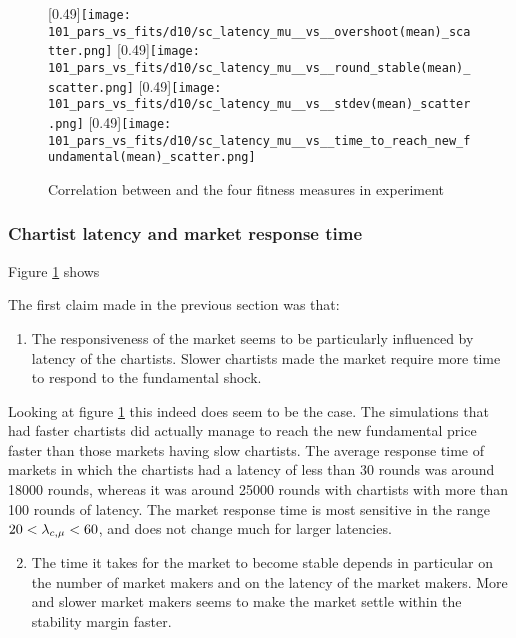 \begin{figure}
	\centering
	[0.49\linewidth]{\texttt{[image: 101\_pars\_vs\_fits/d10/sc\_latency\_mu\_\_vs\_\_overshoot(mean)\_scatter.png]}}
	[0.49\linewidth]{\texttt{[image: 101\_pars\_vs\_fits/d10/sc\_latency\_mu\_\_vs\_\_round\_stable(mean)\_scatter.png]}}
	[0.49\linewidth]{\texttt{[image: 101\_pars\_vs\_fits/d10/sc\_latency\_mu\_\_vs\_\_stdev(mean)\_scatter.png]}}
	[0.49\linewidth]{\texttt{[image: 101\_pars\_vs\_fits/d10/sc\_latency\_mu\_\_vs\_\_time\_to\_reach\_new\_fundamental(mean)\_scatter.png]}}
	\caption{Correlation between \sclatencymu and the four fitness measures in experiment \dten}
	\label{fig:d10_parvfit_sclatencymu}
\end{figure}

\subsubsection{Chartist latency and market response time}
Figure \ref{fig:d10_parvfit_sclatencymu} shows 

The first claim made in the previous section was that:
\begin{enumerate}
\setcounter{enumi}{0}
\item The responsiveness of the market seems to be particularly influenced by latency of the chartists. Slower chartists made the market require more time to respond to the fundamental shock.
\end{enumerate}
Looking at figure \ref{fig:d10_parvfit_sclatencymu} this indeed does seem to be the case. The simulations that had faster chartists did actually manage to reach the new fundamental price faster than those markets having slow chartists. The average response time of markets in which the chartists had a latency of less than 30 rounds was around 18000 rounds, whereas it was around 25000 rounds with chartists with more than 100 rounds of latency. The market response time is most sensitive in the range $20< \lambda_{c, \mu}<60$, and does not change much for larger latencies. 

\begin{enumerate}
\setcounter{enumi}{1}
\item The time it takes for the market to become stable depends in particular on the number of market makers and on the latency of the market makers. More and slower market makers seems to make the market settle within the stability margin faster.
\end{enumerate}

